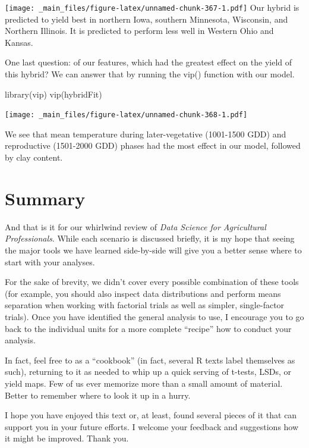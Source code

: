\documentclass[
]{book}
\newenvironment{Shaded}{\begin{snugshade}}{\end{snugshade}}
\newcommand{\FunctionTok}[1]{\textcolor[rgb]{0.00,0.00,0.00}{#1}}
\newcommand{\NormalTok}[1]{#1}
\begin{document}
\texttt{[image: \_main\_files/figure-latex/unnamed-chunk-367-1.pdf]}
Our hybrid is predicted to yield best in northern Iowa, southern Minnesota, Wisconsin, and Northern Illinois. It is predicted to perform less well in Western Ohio and Kansas.

One last question: of our features, which had the greatest effect on the yield of this hybrid? We can answer that by running the vip() function with our model.

\begin{Shaded}
\begin{Highlighting}[]
\FunctionTok{library}\NormalTok{(vip)}
\FunctionTok{vip}\NormalTok{(hybridFit)}
\end{Highlighting}
\end{Shaded}

\texttt{[image: \_main\_files/figure-latex/unnamed-chunk-368-1.pdf]}

We see that mean temperature during later-vegetative (1001-1500 GDD) and reproductive (1501-2000 GDD) phases had the most effect in our model, followed by clay content.

\hypertarget{summary-3}{%
\section{Summary}\label{summary-3}}

And that is it for our whirlwind review of \emph{Data Science for Agricultural Professionals}. While each scenario is discussed briefly, it is my hope that seeing the major tools we have learned side-by-side will give you a better sense where to start with your analyses.

For the sake of brevity, we didn't cover every possible combination of these tools (for example, you should also inspect data distributions and perform means separation when working with factorial trials as well as simpler, single-factor trials). Once you have identified the general analysis to use, I encourage you to go back to the individual units for a more complete ``recipe'' how to conduct your analysis.

In fact, feel free to as a ``cookbook'' (in fact, several R texts label themselves as such), returning to it as needed to whip up a quick serving of t-tests, LSDs, or yield maps. Few of us ever memorize more than a small amount of material. Better to remember where to look it up in a hurry.

I hope you have enjoyed this text or, at least, found several pieces of it that can support you in your future efforts. I welcome your feedback and suggestions how it might be improved. Thank you.

  
\end{document}
